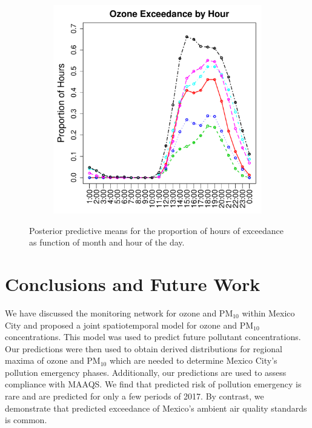 \documentclass[alpha-refs]{wiley-article}
\begin{document}
\begin{figure}[H]
\begin{center}
\begin{subfigure}[b]{.32\textwidth}
      \label{fig:legislated_pm}
   \end{subfigure}
     \begin{subfigure}[b]{.32\textwidth}
     \includegraphics[width=\textwidth]{ozone_byhour}
      \label{fig:legislated_ozone_hour}
   \end{subfigure}
  \end{center}
  \vspace{-4mm}
       \caption{Posterior predictive means for the proportion of hours of exceedance as function of month and hour of the day. }\label{fig:legislated}
\end{figure}

\section{Conclusions and Future Work}\label{sec:conc}

We have discussed the monitoring network for ozone and $\text{PM}_{10}$ within Mexico City and proposed a joint spatiotemporal model for ozone and $\text{PM}_{10}$ concentrations. This model was used to predict future pollutant concentrations. Our predictions were then used to obtain derived distributions for regional maxima of ozone and $\text{PM}_{10}$ which are needed to determine Mexico City's pollution emergency phases. Additionally, our predictions are used to assess compliance with MAAQS. We find that predicted risk of pollution emergency is rare and are predicted for only a few periods of 2017. By contrast, we demonstrate that predicted exceedance of Mexico's ambient air quality standards is common.
\end{document}
